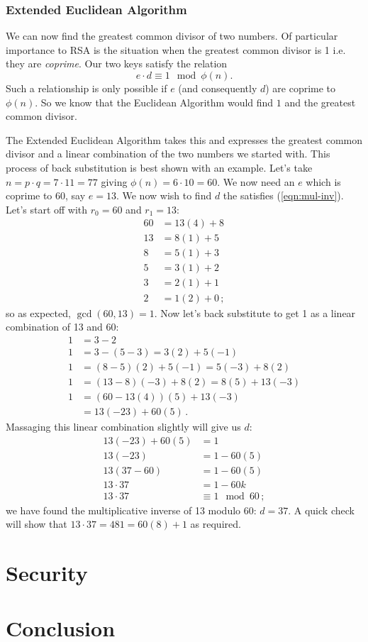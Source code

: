 \documentclass[]{scrartcl}
\theoremstyle{definition}
\let\oldref\ref
\renewcommand{\ref}[1]{(\oldref{#1})}
\begin{document}
\subsubsection{Extended Euclidean Algorithm}
We can now find the greatest common divisor of two numbers. Of particular importance to RSA is the situation when the greatest common divisor is 1 i.e. they are \textit{coprime}. Our two keys satisfy the relation
\begin{equation}\label{eqn:mul-inv}
    e\cdot d \equiv 1 \mod \phi(n).
\end{equation}
Such a relationship is only possible if $e$ (and consequently $d$) are coprime to $\phi(n)$. So we know that the Euclidean Algorithm would find $1$ and the greatest common divisor. 

The Extended Euclidean Algorithm takes this and expresses the greatest common divisor and a linear combination of the two numbers we started with. This process of back substitution is best shown with an example. Let's take $n = p\cdot q = 7\cdot11 = 77$ giving $\phi(n) = 6\cdot 10 = 60$. We now need an $e$ which is coprime to 60, say $e = 13$. We now wish to find $d$ the satisfies \ref{eqn:mul-inv}. Let's start off with $r_0 = 60$ and $r_1 = 13$:
\begin{align*}
    60 &= 13(4) + 8 \\
    13 &= 8(1) + 5 \\
    8  &= 5(1) + 3 \\
    5  &= 3(1) + 2 \\
    3  &= 2(1) + 1 \\
    2  &= 1(2) + 0\,;
\end{align*}
so as expected, $\gcd(60,13) = 1$. Now let's back substitute to get 1 as a linear combination of 13 and 60:
\begin{align*}
    1  &= 3 - 2 \\
    1  &= 3 - (5-3) = 3(2) + 5(-1) \\
    1  &= (8-5)(2) + 5(-1) = 5(-3) + 8(2)\\
    1  &= (13-8)(-3) + 8(2) = 8(5) + 13(-3) \\
    1  &= (60-13(4))(5) + 13(-3) \\
       &= 13(-23) + 60(5)\,.
\end{align*}
Massaging this linear combination slightly will give us $d$:
\begin{align*}
    13(-23) + 60(5) &= 1 \\
    13(-23) &= 1 - 60(5) \\
    13(37-60) &= 1 - 60(5) \\
    13\cdot 37 &= 1 - 60k \\
    13 \cdot 37 &\equiv 1 \mod 60\,;
\end{align*}
we have found the multiplicative inverse of 13 modulo 60: $d=37$. A quick check will show that $13\cdot37=481 = 60(8) + 1$ as required.
\section{Security}

\section{Conclusion}
\end{document}
